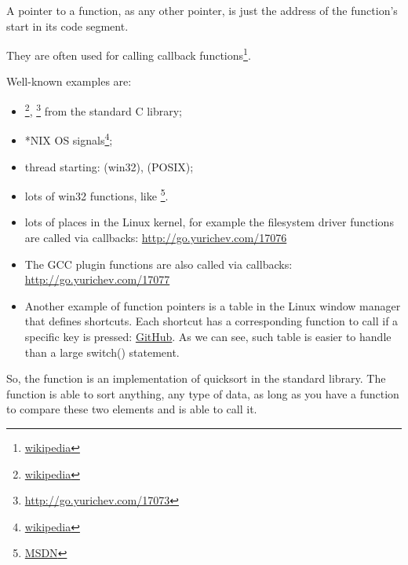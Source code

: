 \newcommand{\comp}{\TT{comp()}\xspace}
\label{sec:pointerstofunctions}

\myindex{\CLanguageElements!\Pointers}

A pointer to a function, as any other pointer, is just the address of the function's start in its code segment.

They are often used for calling callback functions\footnote{\href{http://go.yurichev.com/17071}{wikipedia}}.

Well-known examples are:

\begin{itemize}
\item \qsort\footnote{\href{http://go.yurichev.com/17072}{wikipedia}},
{}\footnote{\url{http://go.yurichev.com/17073}} from the standard C library; 

\item *NIX OS signals\footnote{\href{http://go.yurichev.com/17074}{wikipedia}};

\item thread starting:  (win32),  (POSIX);

\item lots of win32 functions, like \footnote{\href{http://go.yurichev.com/17075}{MSDN}}.

\item lots of places in the Linux kernel, for example the filesystem driver functions are called via callbacks: 
\url{http://go.yurichev.com/17076}

\item The GCC plugin functions are also called via callbacks: 
\url{http://go.yurichev.com/17077}

\item Another example of function pointers is a table in the  Linux window manager that defines shortcuts.
Each shortcut has a corresponding function to call if a specific key is pressed: \href{http://go.yurichev.com/17078}{GitHub}.
As we can see, such table is easier to handle than a large switch() statement.
\end{itemize}


So, the \qsort function is an implementation of quicksort in the \CCpp standard library. 
The function is able to sort anything, any type of data, as long as you have a function to compare these two elements 
and \qsort is able to call it.

